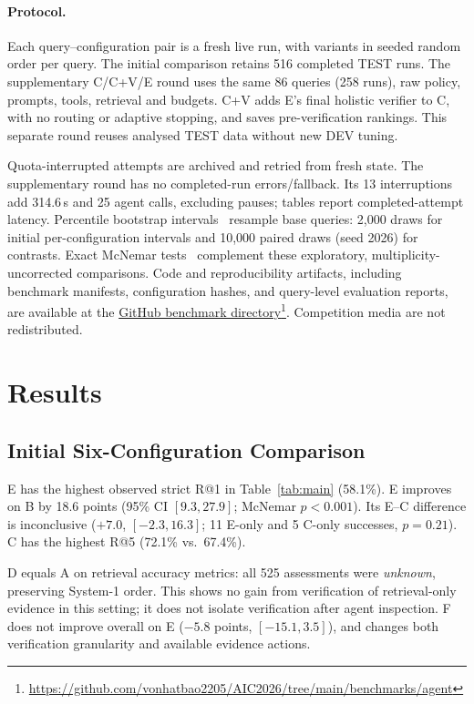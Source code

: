\documentclass[runningheads]{llncs}
\begin{document}
\paragraph{Protocol.} Each query--configuration pair is a fresh live run, with variants in seeded random order per query. The initial comparison retains 516 completed TEST runs. The supplementary C/C+V/E round uses the same 86 queries (258 runs), raw policy, prompts, tools, retrieval and budgets. C+V adds E's final holistic verifier to C, with no routing or adaptive stopping, and saves pre-verification rankings. This separate round reuses analysed TEST data without new DEV tuning.

Quota-interrupted attempts are archived and retried from fresh state. The supplementary round has no completed-run errors/fallback. Its 13 interruptions add 314.6\,s and 25 agent calls, excluding pauses; tables report completed-attempt latency. Percentile bootstrap intervals~\cite{efron1979} resample base queries: 2,000 draws for initial per-configuration intervals and 10,000 paired draws (seed 2026) for contrasts. Exact McNemar tests~\cite{mcnemar1947} complement these exploratory, multiplicity-uncorrected comparisons. Code and reproducibility artifacts, including benchmark manifests, configuration hashes, and query-level evaluation reports, are available at the \href{https://github.com/vonhatbao2205/AIC2026/tree/main/benchmarks/agent}{GitHub benchmark directory}\footnote{\url{https://github.com/vonhatbao2205/AIC2026/tree/main/benchmarks/agent}}. Competition media are not redistributed.

\section{Results}
\label{sec:results}
\subsection{Initial Six-Configuration Comparison}
E has the highest observed strict R@1 in Table~\ref{tab:main} (58.1\%). E improves on B by 18.6 points (95\% CI $[9.3,27.9]$; McNemar $p<0.001$). Its E--C difference is inconclusive ($+7.0$, $[-2.3,16.3]$; 11 E-only and 5 C-only successes, $p=0.21$). C has the highest R@5 (72.1\% vs.\ 67.4\%).

D equals A on retrieval accuracy metrics: all 525 assessments were \emph{unknown}, preserving System-1 order. This shows no gain from verification of retrieval-only evidence in this setting; it does not isolate verification after agent inspection. F does not improve overall on E ($-5.8$ points, $[-15.1,3.5]$), and changes both verification granularity and available evidence actions.
\end{document}
